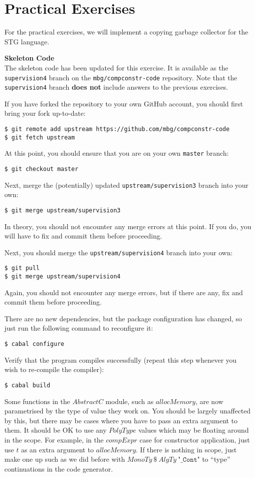 \documentclass[10pt,a4paper]{exam} %
\begin{document}
\section*{Practical Exercises}

For the practical exercises, we will implement a copying garbage collector for the STG language.

\begin{mdframed}
\textbf{Skeleton Code}\\
The skeleton code has been updated for this exercise. It is available as the \texttt{supervision4} branch on the \texttt{mbg/compconstr-code} repository. Note that the \texttt{supervision4} branch \textbf{does not} include answers to the previous exercises.

If you have forked the repository to your own GitHub account, you should first bring your fork up-to-date:
\begin{verbatim}
$ git remote add upstream https://github.com/mbg/compconstr-code
$ git fetch upstream
\end{verbatim}
At this point, you should ensure that you are on your own \texttt{master} branch:
\begin{verbatim}
$ git checkout master
\end{verbatim}
Next, merge the (potentially) updated \texttt{upstream/supervision3} branch into your own:
\begin{verbatim}
$ git merge upstream/supervision3
\end{verbatim}
In theory, you should not encounter any merge errors at this point. If you do, you will have to fix and commit them before proceeding.

Next, you should merge the \texttt{upstream/supervision4} branch into your own:
\begin{verbatim}
$ git pull
$ git merge upstream/supervision4
\end{verbatim}
Again, you should not encounter any merge errors, but if there are any, fix and commit them before proceeding.

There are no new dependencies, but the package configuration has changed, so just run the following command to reconfigure it:
\begin{verbatim}
$ cabal configure
\end{verbatim}
Verify that the program compiles successfully (repeat this step whenever you wish to re-compile the compiler):
\begin{verbatim}
$ cabal build
\end{verbatim}
Some functions in the $\mathit{AbstractC}$ module, such as $\mathit{allocMemory}$, are now parametrised by the type of value they work on. You should be largely unaffected by this, but there may be cases where you have to pass an extra argument to them. It should be OK to use any $\mathit{PolyType}$ values which may be floating around in the scope. For example, in the $\mathit{compExpr}$ case for constructor application, just use $t$ as an extra argument to $\mathit{allocMemory}$. If there is nothing in scope, just make one up such as we did before with $\mathit{MonoTy}~\$~\mathit{AlgTy}~\texttt{"\_Cont"}$ to ``type'' continuations in the code generator.


\end{mdframed}
\end{document}

